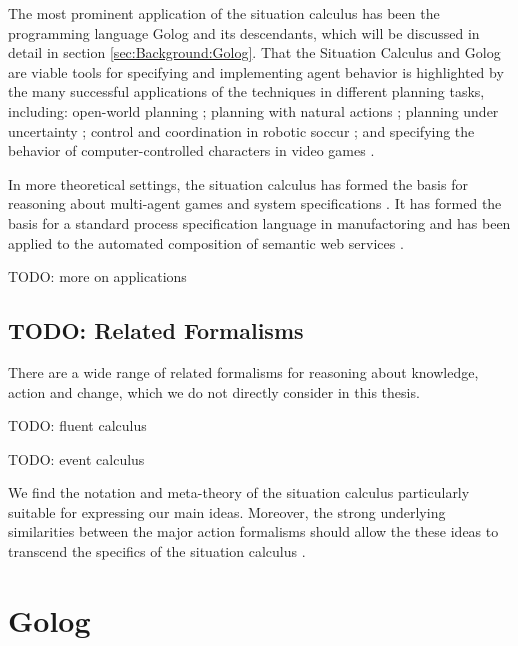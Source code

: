 The most prominent application of the situation calculus has been
the programming language Golog \citep{levesque97golog} and its descendants,
which will be discussed in detail in section \ref{sec:Background:Golog}.
That the Situation Calculus and Golog are viable tools for specifying
and implementing agent behavior is highlighted by the many successful
applications of the techniques in different planning tasks, including:
open-world planning \citep{Finzi00open_world_sitcalc}; planning with
natural actions \citep{pirri00planning_nat_acts}; planning under
uncertainty \citep{baier03golog_planning}; control and coordination
in robotic soccur \citep{Ferrein2005readylog}; and specifying the
behavior of computer-controlled characters in video games \citep{jacobs05unrealgolog}.

In more theoretical settings, the situation calculus has formed the
basis for reasoning about multi-agent games \citep{delgrande01sitcalc_cleudo}
and system specifications \citep{shapiro02casl,lesperance05ecasl}.
It has formed the basis for a standard process specification language
in manufactoring \citep{gruninger04psl} and has been applied to the
automated composition of semantic web services \citep{mcilraith02golog_web_services}.

TODO: more on applications


\subsection{TODO: Related Formalisms}

There are a wide range of related formalisms for reasoning about knowledge,
action and change, which we do not directly consider in this thesis.

TODO: fluent calculus \citep{thielscher99fluentcalc}

TODO: event calculus \citep{kowalski86event_calculus}

We find the notation and meta-theory of the situation calculus particularly
suitable for expressing our main ideas. Moreover, the strong underlying
similarities between the major action formalisms should allow the
these ideas to transcend the specifics of the situation calculus \citet{thielscher06reconcile_sc_fc,thielscher07unifying_action_calculus,vanbentham07ml_sitcalc}.


\section{Golog\label{sec:Background:Golog}}

